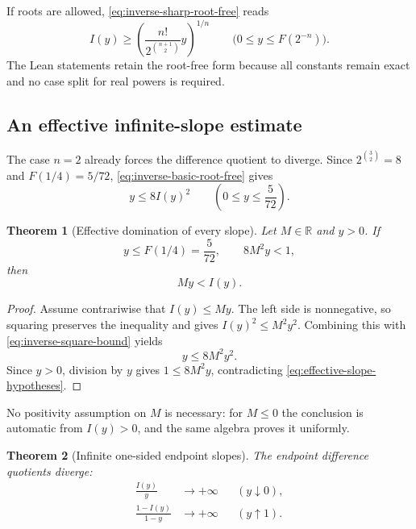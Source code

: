 \documentclass[11pt,oneside]{article}
\newtheorem{theorem}{Theorem}[section]
\theoremstyle{definition}
\theoremstyle{remark}
\newcommand{\R}{\mathbb R}
\begin{document}
If roots are allowed, \eqref{eq:inverse-sharp-root-free} reads
\begin{equation}
 I(y)\ge
 \left(\frac{n!}{2^{\binom{n+1}{2}}}y\right)^{1/n}
 \qquad\bigl(0\le y\le F(2^{-n})\bigr).
 \label{eq:inverse-root-form}
\end{equation}
The Lean statements retain the root-free form because all constants remain exact and no
case split for real powers is required.

\subsection{An effective infinite-slope estimate}

The case $n=2$ already forces the difference quotient to diverge.  Since
$2^{\binom32}=8$ and $F(1/4)=5/72$, \eqref{eq:inverse-basic-root-free} gives
\begin{equation}
 y\le8I(y)^2
 \qquad\left(0\le y\le\frac5{72}\right).
 \label{eq:inverse-square-bound}
\end{equation}

\begin{theorem}[Effective domination of every slope]
\label{thm:inverse-effective-slope}
Let $M\in\R$ and $y>0$.  If
\begin{equation}
 y\le F(1/4)=\frac5{72},
 \qquad
 8M^2y<1,
 \label{eq:effective-slope-hypotheses}
\end{equation}
then
\begin{equation}
 My<I(y).
 \label{eq:effective-slope-conclusion}
\end{equation}
\end{theorem}

\begin{proof}
Assume contrariwise that $I(y)\le My$.  The left side is nonnegative, so squaring preserves
the inequality and gives $I(y)^2\le M^2y^2$.  Combining this with
\eqref{eq:inverse-square-bound} yields
\[
 y\le8M^2y^2.
\]
Since $y>0$, division by $y$ gives $1\le8M^2y$, contradicting
\eqref{eq:effective-slope-hypotheses}.
\end{proof}

No positivity assumption on $M$ is necessary: for $M\le0$ the conclusion is automatic from
$I(y)>0$, and the same algebra proves it uniformly.

\begin{theorem}[Infinite one-sided endpoint slopes]
\label{thm:inverse-infinite-slope}
The endpoint difference quotients diverge:
\begin{align}
 \frac{I(y)}{y}&\longrightarrow+\infty
   &&(y\downarrow0),                                       \label{eq:inverse-slope-zero}\\
 \frac{1-I(y)}{1-y}&\longrightarrow+\infty
   &&(y\uparrow1).                                         \label{eq:inverse-slope-one}
\end{align}
\end{theorem}
\end{document}
